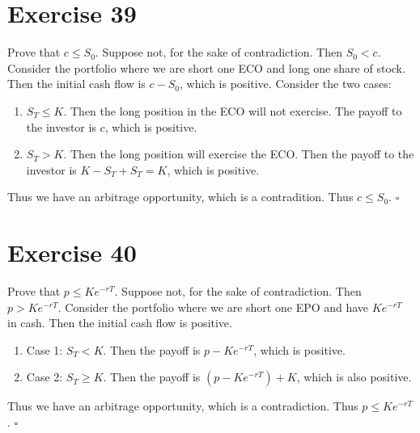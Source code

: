 \documentclass{article}
\begin{document}
\section*{Exercise 39}
\begin{flushleft}
    Prove that $c \leq S_0$. Suppose not, for the sake of contradiction. Then $S_0 < c$. Consider the portfolio where we are short one ECO and long one share of stock.
    Then the initial cash flow is $c - S_0$, which is positive. Consider the two cases:
    \begin{enumerate}
        \item $S_T \leq K$. Then the long position in the ECO will not exercise. The payoff to the investor is $c$, which is positive.
        \item $S_T > K$. Then the long position will exercise the ECO. Then the payoff to the investor is $K - S_T + S_T = K$, which is positive.
    \end{enumerate}
    Thus we have an arbitrage opportunity, which is a contradition. Thus $c \leq S_0$. $\square$
\end{flushleft}

\section*{Exercise 40}
\begin{flushleft}
    Prove that $p \leq Ke^{-rT}$. Suppose not, for the sake of contradiction. Then $p > Ke^{-rT}$. Consider the portfolio where we are short one EPO and have $Ke^{-rT}$ in cash. Then the initial cash flow is positive.
    \begin{enumerate}
        \item Case 1: $S_T < K$. Then the payoff is $p - Ke^{-rT}$, which is positive.
        \item Case 2: $S_T \geq K$. Then the payoff is $(p - Ke^{-rT}) + K$, which is also positive.
    \end{enumerate}
    Thus we have an arbitrage opportunity, which is a contradiction. Thus $p \leq Ke^{-rT}$. $\square$
\end{flushleft}
\end{document}
